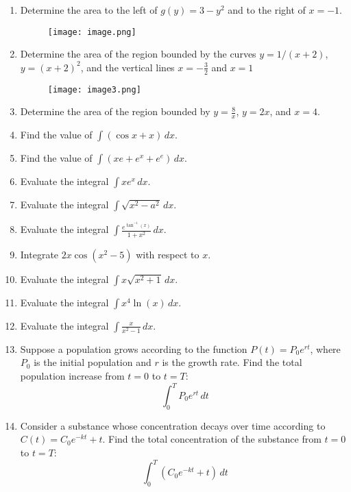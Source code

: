 \documentclass[11pt]{article}
\begin{document}
\begin{enumerate}
    \item Determine the area to the left of \( g(y) = 3 - y^2 \) and to the right of \( x = -1 \).
    \begin{figure}[h]
        \centering
        \texttt{[image: image.png]}

    \end{figure}
    \item Determine the area of the region bounded by the curves \( y = 1/( x + 2) \), \( y = (x+2)^2 \), and the vertical lines \( x = -\frac{3}{2} \) and \( x = 1 \)

    \begin{figure}[h]
        \centering
        \texttt{[image: image3.png]}
    \end{figure}

    \item Determine the area of the region bounded by \( y = \frac{8}{x} \), \( y = 2x \), and \( x = 4 \).
    \item Find the value of \( \int (\cos x + x) \, dx \).
    \item Find the value of \( \int \left( x e + e^x + e^e \right) \, dx \).
    \item Evaluate the integral \( \int x e^x \, dx \).
    \item Evaluate the integral \( \int \sqrt{x^2 - a^2} \, dx \).
    \item Evaluate the integral \( \int \frac{e^{\tan^{-1}(x)}}{1 + x^2} \, dx \).
    \item Integrate \( 2x \cos(x^2 - 5) \) with respect to \( x \).
    \item Evaluate the integral \( \int x \sqrt{x^2 + 1} \, dx \).
    \item Evaluate the integral \( \int x^4 \ln(x) \, dx \).
    \item Evaluate the integral \( \int \frac{x}{x^2 - 1} \, dx \).


    



    \item Suppose a population grows according to the function \( P(t) = P_0 e^{rt} \), where \( P_0 \) is the initial population and \( r \) is the growth rate. Find the total population increase from \( t = 0 \) to \( t = T \):
    \[
    \int_{0}^{T} P_0 e^{rt} \, dt
    \]
    
    \item Consider a substance whose concentration decays over time according to \( C(t) = C_0 e^{-kt} + t \). Find the total concentration of the substance from \( t = 0 \) to \( t = T \):
    \[
    \int_{0}^{T} \left( C_0 e^{-kt} + t \right) \, dt
    \]
    

\end{enumerate}
\end{document}
